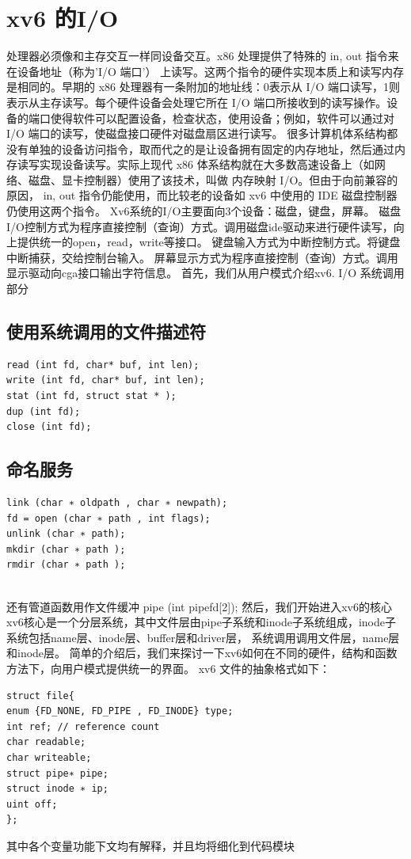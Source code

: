 \documentclass[a4paper,12pt]{report}
\begin{document}
\section{xv6 的I/O }
处理器必须像和主存交互一样同设备交互。x86 处理提供了特殊的 in, out 指令来在设备地址（称为'I/O 端口'） 上读写。这两个指令的硬件实现本质上和读写内存是相同的。早期的 x86 处理器有一条附加的地址线：0表示从 I/O 端口读写，1则表示从主存读写。每个硬件设备会处理它所在 I/O 端口所接收到的读写操作。设备的端口使得软件可以配置设备，检查状态，使用设备；例如，软件可以通过对 I/O 端口的读写，使磁盘接口硬件对磁盘扇区进行读写。
很多计算机体系结构都没有单独的设备访问指令，取而代之的是让设备拥有固定的内存地址，然后通过内存读写实现设备读写。实际上现代 x86 体系结构就在大多数高速设备上（如网络、磁盘、显卡控制器）使用了该技术，叫做 内存映射 I/O。但由于向前兼容的原因， in, out 指令仍能使用，而比较老的设备如 xv6 中使用的 IDE 磁盘控制器仍使用这两个指令。
Xv6系统的I/O主要面向3个设备：磁盘，键盘，屏幕。
磁盘I/O控制方式为程序直接控制（查询）方式。调用磁盘ide驱动来进行硬件读写，向上提供统一的open，read，write等接口。
键盘输入方式为中断控制方式。将键盘中断捕获，交给控制台输入。
屏幕显示方式为程序直接控制（查询）方式。调用显示驱动向cga接口输出字符信息。
首先，我们从用户模式介绍xv6.
I/O 系统调用部分
\subsection{使用系统调用的文件描述符}
\begin{lstlisting}
read (int fd, char* buf, int len);
write (int fd, char* buf, int len);
stat (int fd, struct stat * );
dup (int fd);
close (int fd);

\end{lstlisting}

\subsection{命名服务}
\begin{lstlisting}
link (char ∗ oldpath , char ∗ newpath);
fd = open (char ∗ path , int flags);
unlink (char ∗ path);
mkdir (char ∗ path );
rmdir (char ∗ path );


\end{lstlisting}
还有管道函数用作文件缓冲
pipe (int pipefd[2]);
然后，我们开始进入xv6的核心
xv6核心是一个分层系统，其中文件层由pipe子系统和inode子系统组成，inode子系统包括name层、inode层、buffer层和driver层， 系统调用调用文件层，name层和inode层。
简单的介绍后，我们来探讨一下xv6如何在不同的硬件，结构和函数方法下，向用户模式提供统一的界面。
xv6 文件的抽象格式如下：
\begin{lstlisting}
struct file{
enum {FD_NONE, FD_PIPE , FD_INODE} type;
int ref; // reference count
char readable;
char writeable;
struct pipe∗ pipe;
struct inode ∗ ip;
uint off;
};
\end{lstlisting}
其中各个变量功能下文均有解释，并且均将细化到代码模块
\end{document}

